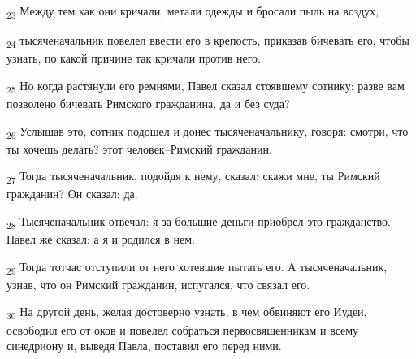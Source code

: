 \begin{tcolorbox}
\textsubscript{23} Между тем как они кричали, метали одежды и бросали пыль на воздух,
\end{tcolorbox}
\begin{tcolorbox}
\textsubscript{24} тысяченачальник повелел ввести его в крепость, приказав бичевать его, чтобы узнать, по какой причине так кричали против него.
\end{tcolorbox}
\begin{tcolorbox}
\textsubscript{25} Но когда растянули его ремнями, Павел сказал стоявшему сотнику: разве вам позволено бичевать Римского гражданина, да и без суда?
\end{tcolorbox}
\begin{tcolorbox}
\textsubscript{26} Услышав это, сотник подошел и донес тысяченачальнику, говоря: смотри, что ты хочешь делать? этот человек--Римский гражданин.
\end{tcolorbox}
\begin{tcolorbox}
\textsubscript{27} Тогда тысяченачальник, подойдя к нему, сказал: скажи мне, ты Римский гражданин? Он сказал: да.
\end{tcolorbox}
\begin{tcolorbox}
\textsubscript{28} Тысяченачальник отвечал: я за большие деньги приобрел это гражданство. Павел же сказал: а я и родился в нем.
\end{tcolorbox}
\begin{tcolorbox}
\textsubscript{29} Тогда тотчас отступили от него хотевшие пытать его. А тысяченачальник, узнав, что он Римский гражданин, испугался, что связал его.
\end{tcolorbox}
\begin{tcolorbox}
\textsubscript{30} На другой день, желая достоверно узнать, в чем обвиняют его Иудеи, освободил его от оков и повелел собраться первосвященникам и всему синедриону и, выведя Павла, поставил его перед ними.
\end{tcolorbox}
